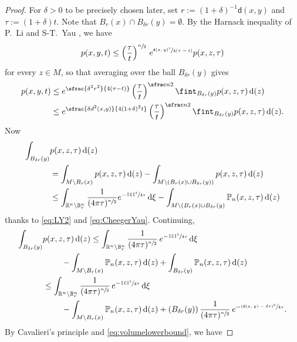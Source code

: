 \documentclass[10pt]{amsart}
\newcommand{\NoChangel}[1]{%
\expandafter\let\csname old\string#1\endcsname=#1
\let#1=\relax
\newcommand{#1}{\mathcode`l="716C\csname old\string#1\endcsname\mathcode`l="7160 }%
}
\theoremstyle{plain}
\theoremstyle{definition}
\newcommand{\setR}{\mathbb{R}}
\newcommand{\bP}{\mathbb{P}}
\newcommand{\setB}{\mathbb{B}}
\newcommand{\di}{\mathop{}\!\mathrm{d}}
\newcommand{\dist}{\mathsf{d}}
\DeclareMathOperator{\vol}{vol}\NoChangel{\vol}
\begin{document}
\begin{proof}
For $\delta>0$ to be precisely chosen later, set $r:=(1+\delta)^{-1}\dist(x,y)$ and $\tau:= (1+\delta)t$. Note that $B_{r}(x) \cap B_{\delta r}(y) = \emptyset$. By the Harnack inequality of P.~Li and S-T.~Yau \cite{LiYau}, we have
\begin{equation}\label{LY}
p(x,y,t)\le \left(\frac{\tau}{t}\right)^{\sfrac n2}\, e^{\sfrac{\dist(z,y)^2}{4(\tau-t)}} p(x,z,\tau)\end{equation}
for every $z\in M$, so that averaging over the ball $B_{\delta r}(y)$ gives
\begin{equation}
\begin{aligned}\label{eq:Colding111}p(x,y,t)&\le e^{\sfrac{\delta^2r^2}{4(\tau-t)} } \left(\frac{\tau}{t}\right)^{\sfrac n2}\fint_{B_{\delta r}(y)}p(x,z,\tau)\di\vol(z) \\
&\le e^{\sfrac{\delta d^2(x,y)}{4(1+\delta)^2t}} \left(\frac{\tau}{t}\right)^{\sfrac n2}\fint_{B_{\delta r}(y)}p(x,z,\tau)\di\vol(z).
\end{aligned}
\end{equation}
Now
\begin{align*}
\int_{B_{\delta r}(y)}&p(x,z,\tau)\di \vol(z)\\
&=\int_{M\setminus B_r(x)}p(x,z,\tau)\di \vol(z)- \int_{M\setminus (B_r(x)\cup B_{\delta r}(y))} p(x,z,\tau)\di \vol(z)\\
&\le \int_{\setR^n\setminus \mathbb{B}_r^n}\frac{1}{(4\pi \tau)^{\sfrac n2}}e^{-\sfrac{\|\xi\|^2}{4\tau}}\di \xi - \int_{M\setminus (B_r(x)\cup B_{\delta r}(y)}\mathbb{P}_n(x,z,\tau)\di \vol(z)
\end{align*}
thanks to \eqref{eq:LY2} and \eqref{eq:CheegerYau}. Continuing,
\begin{align*}
\int_{B_{\delta r}(y)}&p(x,z,\tau)\di \vol(z) \le \int_{\setR^n\setminus \setB_r^n}\frac{1}{(4\pi \tau)^{\sfrac n2}}\,e^{-\sfrac{\|\xi\|^2}{4\tau}}\di \xi\\
&\hspace*{.8cm} - \int_{M\setminus B_r(x)}\bP_n(x,z,\tau)\di \vol(z)
+ \int_{B_{\delta r}(y)}\bP_n(x,z,\tau)\di \vol(z)\\
&\le \int_{\setR^n\setminus \setB_r^n}\frac{1}{(4\pi \tau)^{\sfrac n2}}\,e^{-\sfrac{\|\xi\|^2}{4\tau}}\di \xi \\
&\hspace*{.8cm}- \int_{M\setminus B_r(x)}\bP_n(x,z,\tau)\di \vol(z)+\vol(B_{\delta r}(y))\, \frac{1}{(4\pi \tau)^{\sfrac n2}}\,e^{-\sfrac{(\dist(x,y)-\delta r)^2}{4\tau}}.
\end{align*}
By Cavalieri's principle and \eqref{eq:volumelowerbound}, we have

\end{proof}
\end{document}
